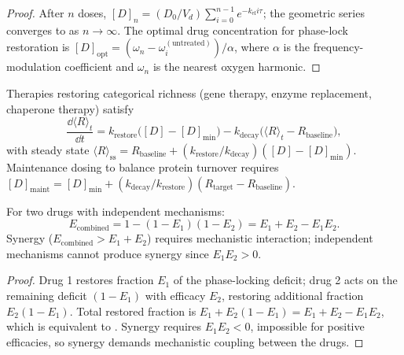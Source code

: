 \begin{proof}
After $n$ doses, $[D]_n = (D_0/V_d)\sum_{i=0}^{n-1} e^{-k_{\mathrm{el}}i\tau}$;
the geometric series converges to  as
$n\to\infty$.  The optimal drug concentration for phase-lock restoration is
$[D]_{\mathrm{opt}} = (\omega_n - \omega_i^{(\mathrm{untreated})})/\alpha$,
where $\alpha$ is the frequency-modulation coefficient and $\omega_n$ is the
nearest oxygen harmonic.
\end{proof}

\begin{theorem}
\label{thm:ch07-richness-restoration}
Therapies restoring categorical richness (gene therapy, enzyme replacement,
chaperone therapy) satisfy
\begin{equation}
  \frac{\dd\langle R\rangle_t}{\dd t}
  = k_{\mathrm{restore}}\bigl([D] - [D]_{\min}\bigr)
    - k_{\mathrm{decay}}\bigl(\langle R\rangle_t - R_{\mathrm{baseline}}\bigr),
  \label{eq:ch07-richness-restoration}
\end{equation}
with steady state
$\langle R\rangle_{\mathrm{ss}}
= R_{\mathrm{baseline}} + (k_{\mathrm{restore}}/k_{\mathrm{decay}})([D]-[D]_{\min})$.
Maintenance dosing to balance protein turnover requires
$[D]_{\mathrm{maint}} = [D]_{\min} + (k_{\mathrm{decay}}/k_{\mathrm{restore}})(R_{\mathrm{target}} - R_{\mathrm{baseline}})$.
\end{theorem}

\begin{theorem}
\label{thm:ch07-combination}
For two drugs with independent mechanisms:
\begin{equation}
  E_{\mathrm{combined}}
  = 1 - (1-E_1)(1-E_2)
  = E_1 + E_2 - E_1 E_2.
  \label{eq:ch07-combination}
\end{equation}
Synergy ($E_{\mathrm{combined}} > E_1 + E_2$) requires mechanistic
interaction; independent mechanisms cannot produce synergy since
$E_1 E_2 > 0$.
\end{theorem}

\begin{proof}
Drug 1 restores fraction $E_1$ of the phase-locking deficit; drug 2 acts
on the remaining deficit $(1-E_1)$ with efficacy $E_2$, restoring additional
fraction $E_2(1-E_1)$.  Total restored fraction is $E_1 + E_2(1-E_1) =
E_1 + E_2 - E_1E_2$, which is equivalent to .
Synergy requires $E_1E_2 < 0$, impossible for positive efficacies, so
synergy demands mechanistic coupling between the drugs.
\end{proof}

